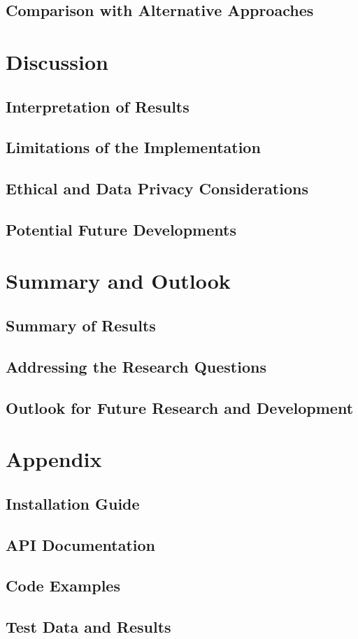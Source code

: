 \documentclass{article}
\begin{document}
\subsection{Comparison with Alternative Approaches}

\newpage


\section{Discussion}

\subsection{Interpretation of Results}
\subsection{Limitations of the Implementation}
\subsection{Ethical and Data Privacy Considerations}
\subsection{Potential Future Developments}

\newpage

\section{Summary and Outlook}

\subsection{Summary of Results}
\subsection{Addressing the Research Questions}
\subsection{Outlook for Future Research and Development}

\newpage

\newpage

\appendix
\section*{Appendix}
\subsection*{Installation Guide}
\subsection*{API Documentation}
\subsection*{Code Examples}
\subsection*{Test Data and Results}



\end{document}
